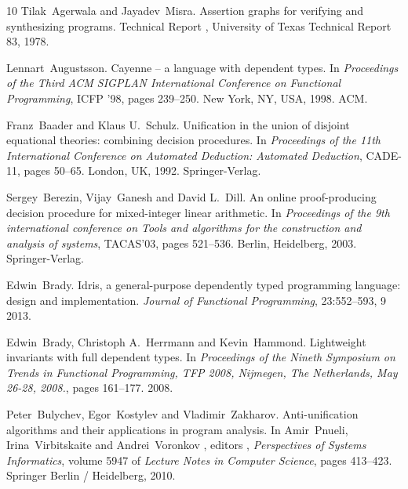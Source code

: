 \documentclass{article}
\newcommand{\tmtextit}[1]{{\itshape{#1}}}
\begin{document}
\begin{thebibliography}{10}
  Tilak~Agerwala  and  Jayadev~Misra.{\newblock}
  Assertion graphs for verifying and synthesizing programs.{\newblock}
  Technical Report , University of Texas Technical Report 83, 1978.{\newblock}
  
  Lennart~Augustsson.{\newblock} Cayenne -- a language
  with dependent types.{\newblock} In \tmtextit{Proceedings of the Third ACM
  SIGPLAN International Conference on Functional Programming}, ICFP '98, 
  pages  239--250. New York, NY, USA, 1998. ACM.{\newblock}
  
  Franz~Baader  and  Klaus U.~Schulz.{\newblock}
  Unification in the union of disjoint equational theories: combining decision
  procedures.{\newblock} In \tmtextit{Proceedings of the 11th International
  Conference on Automated Deduction: Automated Deduction}, CADE-11,  pages 
  50--65. London, UK, 1992. Springer-Verlag.{\newblock}
  
  Sergey~Berezin, Vijay~Ganesh  and  David
  L.~Dill.{\newblock} An online proof-producing decision procedure for
  mixed-integer linear arithmetic.{\newblock} In \tmtextit{Proceedings of the
  9th international conference on Tools and algorithms for the construction
  and analysis of systems}, TACAS'03,  pages  521--536. Berlin, Heidelberg,
  2003. Springer-Verlag.{\newblock}
  
  Edwin~Brady.{\newblock} Idris, a general-purpose
  dependently typed programming language: design and
  implementation.{\newblock} \tmtextit{Journal of Functional Programming},
  23:552--593, 9 2013.{\newblock}
  
  Edwin~Brady, Christoph A.~Herrmann  and 
  Kevin~Hammond.{\newblock} Lightweight invariants with full dependent
  types.{\newblock} In \tmtextit{Proceedings of the Nineth Symposium on Trends
  in Functional Programming, TFP 2008, Nijmegen, The Netherlands, May 26-28,
  2008.},  pages  161--177. 2008.{\newblock}
  
  Peter~Bulychev, Egor~Kostylev  and 
  Vladimir~Zakharov.{\newblock} Anti-unification algorithms and their
  applications in program analysis.{\newblock} In  Amir~Pnueli,
  Irina~Virbitskaite  and  Andrei~Voronkov , editors , \tmtextit{Perspectives
  of Systems Informatics},  volume  5947  of \tmtextit{Lecture Notes in
  Computer Science},  pages  413--423. Springer Berlin / Heidelberg,
  2010.{\newblock}
  

\end{thebibliography}
\end{document}
